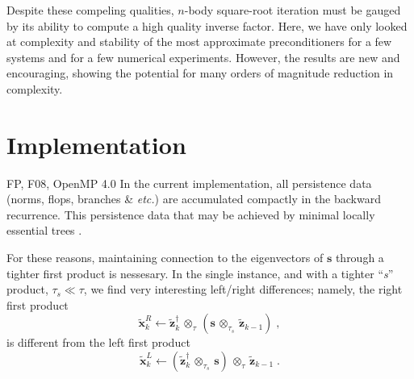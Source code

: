 \documentclass[letterpaper,twocolumn,amsmath,amsfont,amssymb,english,aps,jcp,preprintnumbers,groupaddress,nofootinbib,tightenlines,floatfix]{revtex4}
\newcommand{\mat}[1]{\boldsymbol{#1}}
\newcommand{\ot}{  {\scriptstyle \otimes}_{ \tau } }
\newcommand{\ots}{ {\scriptstyle \otimes}_{ \! \tau_s } }
\theoremstyle{plain}
\theoremstyle{remark}
\theoremstyle{plain}
\begin{document}
Despite these compeling qualities, $n$-body square-root iteration must be gauged by its ability to compute 
a high quality inverse factor.   Here, we have only looked at complexity and stability of the most 
approximate preconditioners for a few systems and for a few numerical experiments.  However, the results are 
new and encouraging, showing the potential for  many orders of magnitude reduction in complexity.


\appendix 

\section{Implementation}


FP, F08, OpenMP 4.0
In the current implementation, all persistence data
(norms, flops, branches \& {\em etc.}) are accumulated compactly in the backward recurrence.  This persistence data
 that may be achieved by minimal locally essential trees \cite{}.



For these reasons, maintaining connection to the eigenvectors of $\mat{s}$ through 
a tighter first product is nessesary.  In the single instance, and with a 
tighter ``{\em s}'' product, $\tau_s \ll \tau$, we find very interesting left/right differences; 
namely, the right first product 
\begin{equation} 
\widetilde{\mat{x}}^R_k \leftarrow \widetilde{\mat{z}}^\dagger_{k} \, \ot  \, \left( \mat{s} \,  \ots \, \widetilde{\mat{z}}_{k-1}  \right) \; ,
\end{equation}
is  different from the left first product 
\begin{equation} 
\widetilde{\mat{x}}^L_k \leftarrow \left(  \widetilde{\mat{z}}^\dagger_{k} \, \ots \, \mat{s} \right) \,  \ot  \, \widetilde{\mat{z}}_{k-1} \; .
\end{equation}
\end{document}
